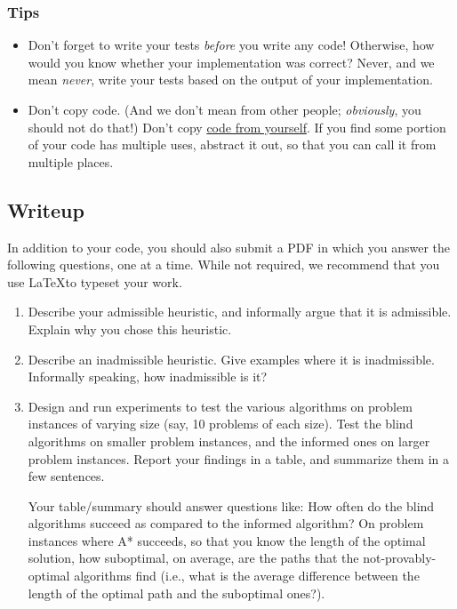\documentclass{article}
\begin{document}
\subsubsection{Tips}

\begin{itemize}

\item
  Don't forget to write your tests \emph{before\/} you write any code!
  Otherwise, how would you know whether your implementation was correct?
  Never, and we mean \emph{never\/}, write your tests based on the output of your implementation.

\item
  Don't copy code.
  (And we don't mean from other people; \emph{obviously}, you should not do that!)
  Don't copy \href{https://en.wikipedia.org/wiki/Don%27t_repeat_yourself}{code from yourself}.
  If you find some portion of your code has multiple uses,
  abstract it out, so that you can call it from multiple places.

\end{itemize}


\subsection{Writeup} \label{writeup}

In addition to your code, you should also submit a PDF in which you
answer the following questions, one at a time.  While not required, we
recommend that you use \LaTeX to typeset your work.

\begin{enumerate}

\item Describe your admissible heuristic, and informally argue that it is
  admissible. Explain why you chose this heuristic.

\item Describe an inadmissible heuristic. Give examples where it is
  inadmissible. Informally speaking, how inadmissible is it?

\item Design and run experiments to test the various algorithms on
  problem instances of varying size (say, 10 problems of each size).
  Test the blind algorithms on smaller problem instances, and the
  informed ones on larger problem instances.  Report your findings in
  a table, and summarize them in a few sentences.

  Your table/summary should answer questions like: How often do the blind
  algorithms succeed as compared to the informed algorithm? On problem
  instances where A* succeeds, so that you know the length of the optimal
  solution, how suboptimal, on average, are the paths that the
  not-provably-optimal algorithms find (i.e., what is the average difference
  between the length of the optimal path and the suboptimal ones?).

\end{enumerate}
\end{document}
